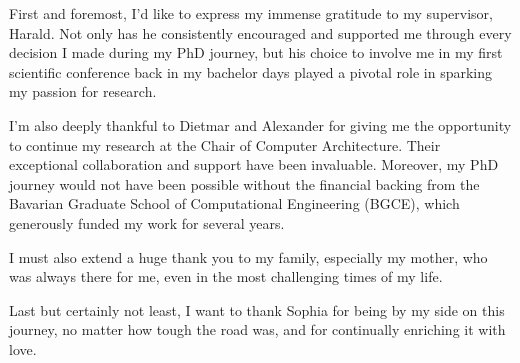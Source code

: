 First and foremost, I’d like to express my immense gratitude to my supervisor, Harald. Not only has he consistently encouraged and supported me through every decision I made during my PhD journey, but his choice to involve me in my first scientific conference back in my bachelor days played a pivotal role in sparking my passion for research.

I’m also deeply thankful to Dietmar and Alexander for giving me the opportunity to continue my research at the Chair of Computer Architecture. Their exceptional collaboration and support have been invaluable. Moreover, my PhD journey would not have been possible without the financial backing from the Bavarian Graduate School of Computational Engineering (BGCE), which generously funded my work for several years.

I must also extend a huge thank you to my family, especially my mother, who was always there for me, even in the most challenging times of my life.

Last but certainly not least, I want to thank Sophia for being by my side on this journey, no matter how tough the road was, and for continually enriching it with love.